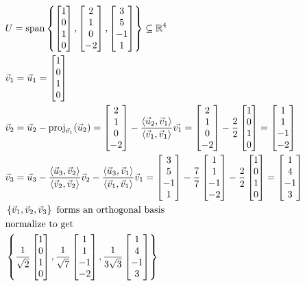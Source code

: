 \documentclass[11pt, fleqn]{article}
\begin{document}
\begin{align*}
    &U=\spann\brcurly{\matrixx{1\\0\\1\\0},\matrixx{2\\1\\0\\-2},\matrixx{3\\5\\-1\\1}}\subseteq\R^4\\
    &\vec{v}_1=\vec{u}_1=\matrixx{1\\0\\1\\0}\\
    &\vec{v}_2=\vec{u}_2-\proj_{\vec{v}_1}(\vec{u}_2)=\matrixx{2\\1\\0\\-2}-\frac{\brangle{\vec{u}_2,\vec{v}_1}}{\brangle{\vec{v}_1,\vec{v}_1}}\vec{v_1}=\matrixx{2\\1\\0\\-2}-\frac{2}{2}\matrixx{1\\0\\1\\0}=\matrixx{1\\1\\-1\\-2}\\
    &\vec{v}_3=\vec{u}_3-\frac{\brangle{\vec{u}_3,\vec{v}_2}}{\brangle{\vec{v}_2,\vec{v}_2}}\vec{v}_2-\frac{\brangle{\vec{u}_3,\vec{v}_1}}{\brangle{\vec{v}_1,\vec{v}_1}}\vec{v}_1=\matrixx{3\\5\\-1\\1}-\frac{7}{7}\matrixx{1\\1\\-1\\-2}-\frac{2}{2}\matrixx{1\\0\\1\\0}=\matrixx{1\\4\\-1\\3}\\
    &\brcurly{\vec{v}_1,\vec{v}_2,\vec{v}_3}\text{ forms an orthogonal basis}\\
    &\text{normalize to get}\\
    &\brcurly{\frac{1}{\sqrt{2}}\matrixx{1\\0\\1\\0},\frac{1}{\sqrt{7}}\matrixx{1\\1\\-1\\-2},\frac{1}{3\sqrt{3}}\matrixx{1\\4\\-1\\3}}
\end{align*}
\end{document}
